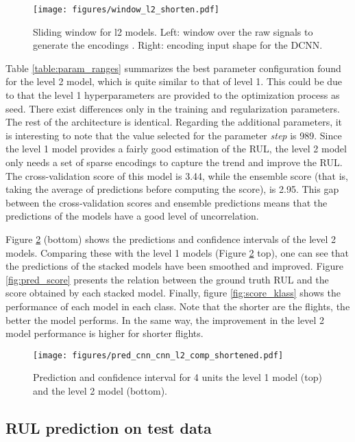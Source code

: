 \documentclass[PHM, 2021]{PHMSociety}
\begin{document}
\begin{figure}[t]
\centering
\texttt{[image: figures/window\_l2\_shorten.pdf]}
\caption{Sliding window for l2 models. Left: window over the raw signals to generate the encodings . Right: encoding input shape for the DCNN.}
\label{fig:window2}
\end{figure}

Table \ref{table:param_ranges} summarizes the best parameter configuration found for the level 2 model, which is quite similar to that of level 1. This could be due to that the level 1 hyperparameters are provided to the optimization process as seed. There exist differences only in the training and regularization parameters. The rest of the architecture is identical. Regarding the additional parameters, it is interesting to note that the value selected for the parameter \textit{step} is 989. Since the level 1 model provides a fairly good estimation of the RUL, the level 2 model only needs a set of sparse encodings to capture the trend and improve the RUL. The cross-validation score of this model is 3.44, while the ensemble score (that is, taking the average of predictions before computing the score), is 2.95. This gap between the cross-validation scores and ensemble predictions means that the predictions of the models have a good level of uncorrelation.

Figure \ref{fig:predl2} (bottom) shows the predictions and confidence intervals of the level 2 models. Comparing these with the level 1 models (Figure \ref{fig:predl2} top), one can see that the predictions of the stacked models have been smoothed and improved. Figure \ref{fig:pred_score} presents the relation between the ground truth RUL and the score obtained by each stacked model. Finally, figure \ref{fig:score_klass} shows the performance of each  model in each class. Note that the shorter are the flights, the better the model performs. In the same way, the improvement in the level 2 model performance is higher for shorter flights.

\begin{figure}[t]
\centering
\texttt{[image: figures/pred\_cnn\_cnn\_l2\_comp\_shortened.pdf]}
\caption{Prediction and confidence interval for 4 units the level 1 model (top) and the level 2 model (bottom).}
\label{fig:predl2}
\end{figure}

\subsection{RUL prediction on test data}
\end{document}
